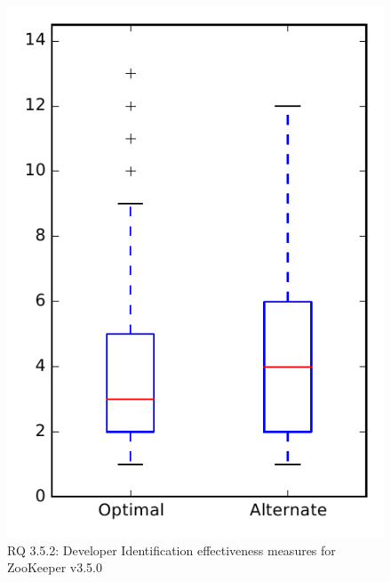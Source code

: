 
\begin{figure}
\centering
\includegraphics[height=0.4\textheight]{figures/combo/dit_rq2_zookeeper}
\caption{RQ 3.5.2: Developer Identification effectiveness measures for ZooKeeper v3.5.0}
\label{fig:dit:rq2:zookeeper}
\end{figure}
